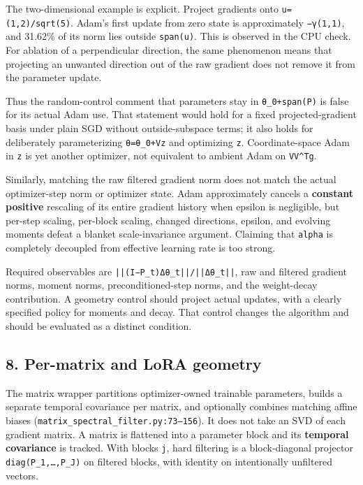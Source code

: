 \documentclass[
  british,
  10pt,
  a4paper,
]{article}
\begin{document}
The two-\allowbreak{}dimensional example is explicit. Project gradients
onto \texttt{u=\allowbreak{}(1,\allowbreak{}2)/\allowbreak{}sqrt(5)}.
Adam's first update from zero state is approximately \texttt{−γ(1,1)},
and 31.62\% of its norm lies outside \texttt{span(u)}. This is observed
in the CPU check. For ablation of a perpendicular direction, the same
phenomenon means that projecting an unwanted direction out of the raw
gradient does not remove it from the parameter update.

Thus the random-\allowbreak{}control comment that parameters stay in
\texttt{θ\_\allowbreak{}0+span(P)} is false for its actual Adam use.
That statement would hold for a fixed projected-\allowbreak{}gradient
basis under plain SGD without outside-\allowbreak{}subspace terms; it
also holds for deliberately parameterizing \texttt{θ=θ\_0+Vz} and
optimizing \texttt{z}. Coordinate-\allowbreak{}space Adam in \texttt{z}
is yet another optimizer, not equivalent to ambient Adam on
\texttt{VV\^{}Tg}.

Similarly, matching the raw filtered gradient norm does not match the
actual optimizer-\allowbreak{}step norm or optimizer state. Adam
approximately cancels a \textbf{constant positive} rescaling of its
entire gradient history when epsilon is negligible,\allowbreak{} but
per-step scaling, per-block scaling, changed directions,\allowbreak{}
epsilon, and evolving moments defeat a blanket
scale-\allowbreak{}invariance argument. Claiming that \texttt{alpha} is
completely decoupled from effective learning rate is too strong.

Required observables are
\texttt{||(I−P\_\allowbreak{}t)Δθ\_\allowbreak{}t||/\allowbreak{}||Δθ\_\allowbreak{}t||},
raw and filtered gradient norms, moment norms,
precondition\allowbreak{}ed-\allowbreak{}step norms, and the
weight-\allowbreak{}decay contribution\allowbreak{}.\allowbreak{} A
geometry control should project actual updates, with a clearly specified
policy for moments and decay. That control changes the algorithm and
should be evaluated as a distinct condition.

\subsection{8. Per-matrix and LoRA
geometry}\label{mathematical-audit--per-matrix-and-lora-geometry}

The matrix wrapper partitions optimizer-\allowbreak{}owned trainable
parameters,\allowbreak{} builds a separate temporal covariance per
matrix, and optionally combines matching affine biases
(\texttt{matrix\_\allowbreak{}spectral\_\allowbreak{}filter.\allowbreak{}py:\allowbreak{}73–156}).
It does not take an SVD of each gradient matrix. A matrix is flattened
into a parameter block and its \textbf{temporal covariance} is tracked.
With blocks \texttt{j}, hard filtering is a block-\allowbreak{}diagonal
projector
\texttt{diag(P\_\allowbreak{}1,\allowbreak{}…,\allowbreak{}P\_\allowbreak{}J)}
on filtered blocks, with identity on intentionally unfiltered vectors.
\end{document}
